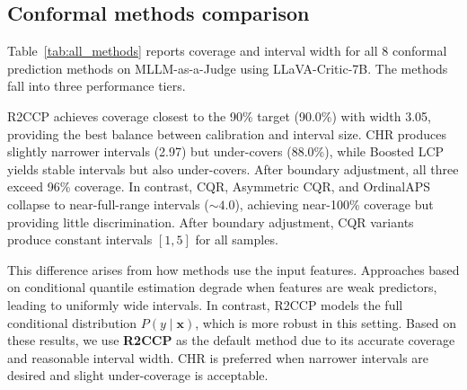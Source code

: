 \documentclass{article}
\begin{document}
\subsection{Conformal methods comparison}
\label{sec:methods_comparison}

Table~\ref{tab:all_methods} reports coverage and interval width for all 8 conformal prediction methods on MLLM-as-a-Judge using LLaVA-Critic-7B. The methods fall into three performance tiers.

R2CCP achieves coverage closest to the 90\% target (90.0\%) with width 3.05, providing the best balance between calibration and interval size. CHR produces slightly narrower intervals (2.97) but under-covers (88.0\%), while Boosted LCP yields stable intervals but also under-covers. After boundary adjustment, all three exceed 96\% coverage. In contrast, CQR, Asymmetric CQR, and OrdinalAPS collapse to near-full-range intervals (${\sim}4.0$), achieving near-100\% coverage but providing little discrimination. After boundary adjustment, CQR variants produce constant intervals $[1,5]$ for all samples.

This difference arises from how methods use the input features. Approaches based on conditional quantile estimation degrade when features are weak predictors, leading to uniformly wide intervals. In contrast, R2CCP models the full conditional distribution $P(y \mid \mathbf{x})$, which is more robust in this setting. Based on these results, we use \textbf{R2CCP} as the default method due to its accurate coverage and reasonable interval width. CHR is preferred when narrower intervals are desired and slight under-coverage is acceptable.
\end{document}
